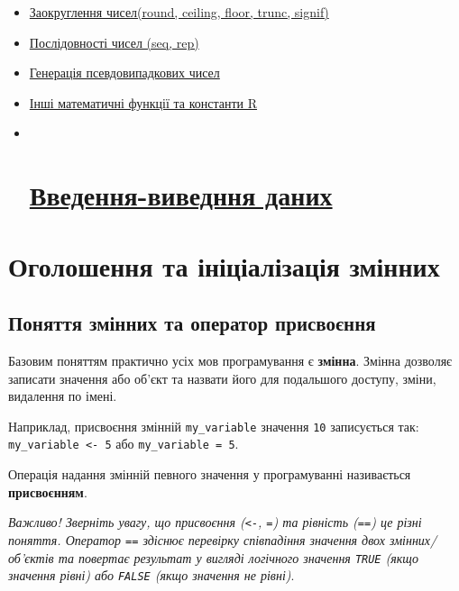 \documentclass[
]{book}
\begin{document}
\begin{itemize}
  \begin{itemize}
  \item
    \protect\hyperlink{chapter241}{Заокруглення чисел(round, ceiling, floor, trunc, signif)}
  \item
    \protect\hyperlink{chapter242}{Послідовності чисел (seq, rep)}
  \item
    \protect\hyperlink{chapter243}{Генерація псевдовипадкових чисел}
  \item
    \protect\hyperlink{chapter244}{Інші математичні функції та константи R}
  \item ~
    \hypertarget{ux432ux432ux435ux434ux435ux43dux43dux44f-ux432ux438ux432ux435ux434ux43dux43dux44f-ux434ux430ux43dux438ux445}{%
    \section{\texorpdfstring{\protect\hyperlink{chapter245}{Введення-виведння даних}}{Введення-виведння даних}}\label{ux432ux432ux435ux434ux435ux43dux43dux44f-ux432ux438ux432ux435ux434ux43dux43dux44f-ux434ux430ux43dux438ux445}}
  \end{itemize}
\end{itemize}

\hypertarget{chapter21}{%
\section{Оголошення та ініціалізація змінних}\label{chapter21}}

\hypertarget{chapter211}{%
\subsection{Поняття змінних та оператор присвоєння}\label{chapter211}}

Базовим поняттям практично усіх мов програмування є \textbf{змінна}. Змінна дозволяє записати значення або об'єкт та назвати його для подальшого доступу, зміни, видалення по імені.

Наприклад, присвоєння змінній \texttt{my\_variable} значення \texttt{10} записується так: \texttt{my\_variable\ \textless{}-\ 5} або \texttt{my\_variable\ =\ 5}.

Операція надання змінній певного значення у програмуванні називається \textbf{присвоєнням}.

\emph{Важливо! Зверніть увагу, що присвоєння (\texttt{\textless{}-}, \texttt{=}) та рівність (\texttt{==}) це різні поняття. Оператор \texttt{==} здіснює перевірку співпадіння значення двох змінних/об'єктів та повертає результат у вигляді логічного значення \texttt{TRUE} (якщо значення рівні) або \texttt{FALSE} (якщо значення не рівні)}.
\end{document}
